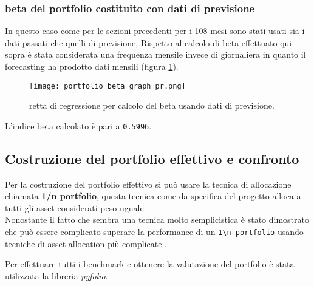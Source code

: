 \pagebreak

\subsubsection{beta del portfolio costituito con dati di previsione}

In questo caso come per le sezioni precedenti per i 108 mesi sono stati usati sia i dati passati che quelli di previsione,
Rispetto al calcolo di beta effettuato qui sopra è stata considerata una frequenza mensile invece di giornaliera in quanto
il forecasting ha prodotto dati mensili (figura \ref{fig:pf_optima_pr_beta_graph}).

\begin{figure}[ht]
    \centering
    \texttt{[image: portfolio\_beta\_graph\_pr.png]}
    \caption{retta di regressione per calcolo del beta usando dati di previsione.}
    \label{fig:pf_optima_pr_beta_graph}
\end{figure}

L'indice beta calcolato è pari a \verb|0.5996|.

\subsection{Costruzione del portfolio effettivo e confronto}

Per la costruzione del portfolio effettivo si può usare la tecnica di allocazione chiamata \textbf{1/n portfolio}, questa
tecnica come da specifica del progetto alloca a tutti gli asset considerati peso uguale.\\
Nonostante il fatto che sembra una tecnica molto semplicistica è stato 
dimostrato  che può essere complicato superare la performance di un \verb|1\n portfolio| usando tecniche di asset allocation più complicate \cite{10.1093/rfs/hhm075}.

Per effettuare tutti i benchmark e ottenere la valutazione del portfolio è stata utilizzata la libreria \emph{pyfolio}.

